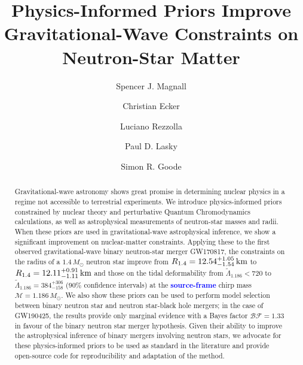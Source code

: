 \documentclass[twocolumn,linenumbers]{aastex631}
\newcommand{\blue}[1]{\textcolor{blue}{\textbf{#1}}}
\begin{document}
	
\title{Physics-Informed Priors Improve Gravitational-Wave Constraints on
  Neutron-Star Matter}


\author[0009-0000-7037-1809]{Spencer J. Magnall}

\author[0000-0002-8669-4300]{Christian Ecker}

\author[0000-0002-1330-7103]{Luciano Rezzolla}

\author[0000-0003-3763-1386]{Paul D. Lasky}


\author[0000-0002-9575-5152]{Simon R. Goode}


\begin{abstract}
 Gravitational-wave astronomy shows great promise in determining nuclear
 physics in a regime not accessible to terrestrial experiments. We
 introduce physics-informed priors constrained by nuclear theory and
 perturbative Quantum Chromodynamics calculations, as well as
 astrophysical measurements of neutron-star masses and radii.  When these
 priors are used in gravitational-wave astrophysical inference, we show a
 significant improvement on nuclear-matter constraints. Applying these
 to the first observed gravitational-wave binary neutron-star merger
 GW170817, the constraints on the radius of a $1.4\,M_\odot$ neutron star
 improve from $R_{1.4} = {12.54^{+1.05}_{-1.54}} \, {\rm km}$ to $R_{1.4}
 = 12.11^{+0.91}_{-1.11} \,{\rm km}$ and those on the tidal deformability
 from $\tilde{\Lambda}_{1.186} < 720$ to $\tilde{\Lambda}_{1.186} =
 384^{+306}_{-158}$ ($90\%$ confidence intervals) at the
 \blue{source-frame} chirp mass $\mathcal{M}=1.186\,M_\odot$. We also
 show these priors can be used to perform model selection between binary
 neutron star and neutron star-black hole mergers; in the case of
 GW190425, the results provide only marginal evidence with a Bayes factor
 $\mathcal{BF}=1.33$ in favour of the binary neutron star merger
 hypothesis.  Given their ability to improve the astrophysical inference
 of binary mergers involving neutron stars, we advocate for these
 physics-informed priors to be used as standard in the literature and
 provide open-source code for reproducibility and adaptation of the
 method.
\end{abstract}
	
\end{document}
